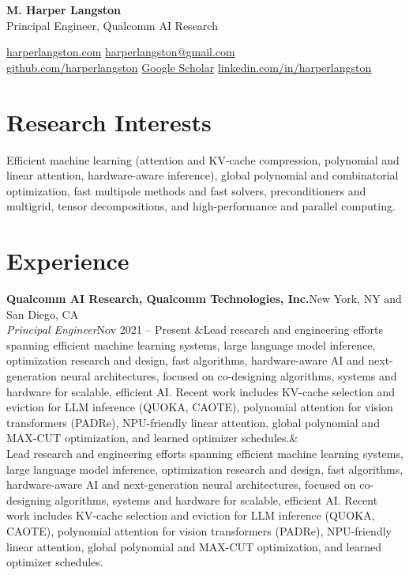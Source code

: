 \documentclass[10pt,letterpaper]{article}
\newcommand{\job}[5]{%
  \textbf{#1}\hfill{\color{muted}#2}\\
  \textit{#3}\hfill{\color{muted}#4}%
  \ifx&#5&\else\\[1pt]{\small #5}\fi
  \par\vspace{6pt}}
\begin{document}
{\centering
  {\fontsize{24}{28}\selectfont\bfseries M. Harper Langston}\\[4pt]
  {\large Principal Engineer, Qualcomm AI Research}\\[6pt]
  {\small\color{muted}
    \href{https://harperlangston.com}{harperlangston.com} \enspace\textperiodcentered\enspace
    \href{mailto:harperlangston@gmail.com}{harperlangston@gmail.com}\\[1pt]
    \href{https://github.com/harperlangston}{github.com/harperlangston} \enspace\textperiodcentered\enspace
    \href{https://scholar.google.com/citations?user=I1-ydOQAAAAJ}{Google Scholar} \enspace\textperiodcentered\enspace
    \href{https://www.linkedin.com/in/harperlangston}{linkedin.com/in/harperlangston}\par}

\section{Research Interests}
Efficient machine learning (attention and KV-cache compression, polynomial and linear attention, hardware-aware
inference), global polynomial and combinatorial optimization, fast multipole methods and fast solvers,
preconditioners and multigrid, tensor decompositions, and high-performance and parallel computing.

\section{Experience}

\job{Qualcomm AI Research, Qualcomm Technologies, Inc.}{New York, NY and San Diego, CA}
    {Principal Engineer}{Nov 2021 -- Present}
    {Lead research and engineering efforts spanning efficient machine learning systems, large language model
     inference, optimization research and design, fast algorithms, hardware-aware AI and next-generation neural
     architectures, focused on co-designing algorithms, systems and hardware for scalable, efficient AI. Recent work
     includes KV-cache selection and eviction for LLM inference (QUOKA, CAOTE), polynomial attention for vision
     transformers (PADRe), NPU-friendly linear attention, global polynomial and MAX-CUT optimization, and learned
     optimizer schedules.}

}
\end{document}
